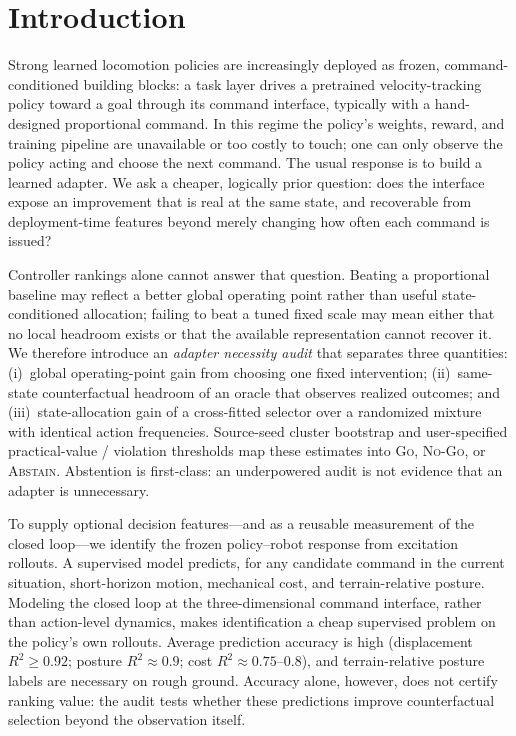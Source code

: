 \documentclass{article}
\begin{document}
\section{Introduction}
\label{sec:intro}

Strong learned locomotion policies are increasingly deployed as frozen,
command-conditioned building blocks: a task layer drives a pretrained
velocity-tracking policy toward a goal through its command interface, typically
with a hand-designed proportional command. In this regime the policy's weights,
reward, and training pipeline are unavailable or too costly to touch; one can
only observe the policy acting and choose the next command. The usual response
is to build a learned adapter. We ask a cheaper, logically prior question:
does the interface expose an improvement that is real at the same state, and
recoverable from deployment-time features beyond merely changing how often each
command is issued?

Controller rankings alone cannot answer that question. Beating a proportional
baseline may reflect a better global operating point rather than useful
state-conditioned allocation; failing to beat a tuned fixed scale may mean either
that no local headroom exists or that the available representation cannot recover
it. We therefore introduce an \emph{adapter necessity audit} that separates three
quantities: (i)~global operating-point gain from choosing one fixed intervention;
(ii)~same-state counterfactual headroom of an oracle that observes realized
outcomes; and (iii)~state-allocation gain of a cross-fitted selector over a
randomized mixture with identical action frequencies. Source-seed cluster
bootstrap and user-specified practical-value / violation thresholds map these
estimates into \textsc{Go}, \textsc{No-Go}, or \textsc{Abstain}. Abstention is
first-class: an underpowered audit is not evidence that an adapter is unnecessary.

To supply optional decision features---and as a reusable measurement of the
closed loop---we identify the frozen policy--robot response from excitation
rollouts. A supervised model predicts, for any candidate command in the current
situation, short-horizon motion, mechanical cost, and terrain-relative posture.
Modeling the closed loop at the three-dimensional command interface, rather than
action-level dynamics, makes identification a cheap supervised problem on the
policy's own rollouts. Average prediction accuracy is high (displacement
$R^2\ge0.92$; posture $R^2\approx0.9$; cost $R^2\approx0.75$--$0.8$), and
terrain-relative posture labels are necessary on rough ground. Accuracy alone,
however, does not certify ranking value: the audit tests whether these
predictions improve counterfactual selection beyond the observation itself.
\end{document}
